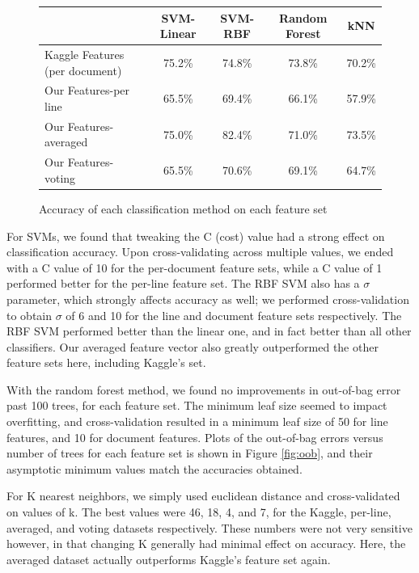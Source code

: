 \documentclass[paper=a4, fontsize=11pt]{scrartcl} %
\numberwithin{equation}{section} %
\numberwithin{figure}{section} %
\numberwithin{table}{section} %
\begin{document}
\begin{figure}
  \begin{center}
    \begin{tabular} { | l | c | c | c | c | }
      \hline
      & SVM-Linear & SVM-RBF & Random Forest & kNN \\ \hline
      Kaggle Features (per document) & 75.2\% & 74.8\% & 73.8\% & 70.2\% \\ \hline
      Our Features-per line & 65.5\% & 69.4\% & 66.1\% & 57.9\% \\ \hline
      Our Features-averaged & 75.0\% & 82.4\% & 71.0\% & 73.5\% \\ \hline
      Our Features-voting & 65.5\% & 70.6\% & 69.1\% & 64.7\% \\ \hline
    \end{tabular}
  \end{center}
  \caption{Accuracy of each classification method on each feature set}
  \label{fig:resultsTable}
\end{figure}

For SVMs, we found that tweaking the C (cost) value had a strong effect on classification
accuracy. Upon cross-validating across multiple values, we ended with
a C value of 10 for the per-document feature sets, while a C value of
1 performed better for the per-line feature set. The RBF SVM also has
a $\sigma$ parameter, which strongly affects accuracy as well; we
performed cross-validation to obtain $\sigma$ of 6 and 10 for the line
and document feature sets respectively. The RBF SVM performed better
than the linear one, and in fact better than all other
classifiers. Our averaged feature vector also greatly outperformed the
other feature sets here, including Kaggle's set.

With the random forest method, we found no improvements in out-of-bag
error past 100 trees, for each feature set. The minimum leaf size
seemed to impact overfitting, and cross-validation resulted in a
minimum leaf size of 50 for line features, and 10 for document
features. Plots of the out-of-bag errors versus number of trees for
each feature set is shown in Figure \ref{fig:oob}, and their
asymptotic minimum values match the accuracies obtained.

For K nearest neighbors, we simply used euclidean distance and
cross-validated on values of k. The best values were 46, 18, 4, and 7,
for the Kaggle, per-line, averaged, and voting datasets
respectively. These numbers were not very sensitive however, in that
changing K generally had minimal effect on accuracy. Here, the
averaged dataset actually outperforms Kaggle's feature set again.
\end{document}
